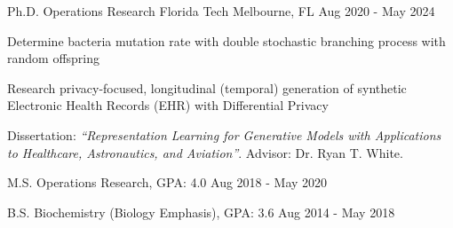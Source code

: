 
\begin{cventries}
	\cventry
	{Ph.D. Operations Research}
	{Florida Tech}
	{Melbourne, FL}
	{Aug 2020 - May 2024}
	{\begin{cvitems}
			\item {Determine bacteria mutation rate with double stochastic branching process with random offspring}
			\item {Research privacy-focused, longitudinal (temporal) generation of synthetic Electronic Health Records (EHR) with Differential Privacy}
			\item {Dissertation: \textit{``Representation Learning for Generative Models with Applications to Healthcare, Astronautics, and Aviation''}. Advisor: Dr. Ryan T. White.}
		\end{cvitems}}
	\vspace{-2mm}

	\cventry
	{M.S. Operations Research, GPA: 4.0}
	{}
	{}
	{Aug 2018 - May 2020}
	{}
	\vspace{-5mm}

	\cventry
	{B.S. Biochemistry (Biology Emphasis), GPA: 3.6}
	{}
	{}
	{Aug 2014 - May 2018}
	{}
	\vspace{-5mm}

\end{cventries}